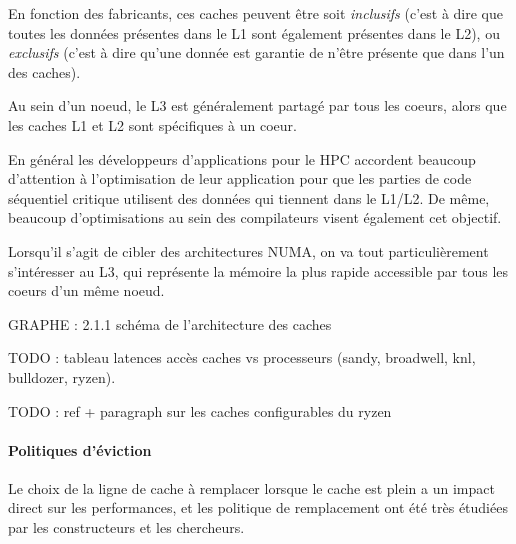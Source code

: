 En fonction des fabricants, ces caches peuvent être soit \emph{inclusifs} (c'est à dire que toutes les données présentes dans le L1 sont également présentes dans le L2), ou \emph{exclusifs} (c'est à dire qu'une donnée est garantie de n'être présente que dans l'un des caches).

Au sein d'un noeud, le L3 est généralement partagé par tous les coeurs, alors que les caches L1 et L2 sont spécifiques à un coeur.

En général les développeurs d'applications pour le HPC accordent beaucoup d'attention à l'optimisation de leur application pour que les parties de code séquentiel critique utilisent des données qui tiennent dans le L1/L2.
De même, beaucoup d'optimisations au sein des compilateurs visent également cet objectif.

Lorsqu'il s'agit de cibler des architectures NUMA, on va tout particulièrement s'intéresser au L3, qui représente la mémoire la plus rapide accessible par tous les coeurs d'un même noeud.

GRAPHE : 2.1.1 schéma de l'architecture des caches

TODO : tableau latences accès caches vs processeurs (sandy, broadwell, knl, bulldozer, ryzen).

TODO : ref + paragraph sur les caches configurables du ryzen

\paragraph{Politiques d'éviction}

Le choix de la ligne de cache à remplacer lorsque le cache est plein a un impact direct sur les performances, et les politique de remplacement ont été très étudiées par les constructeurs et les chercheurs.

